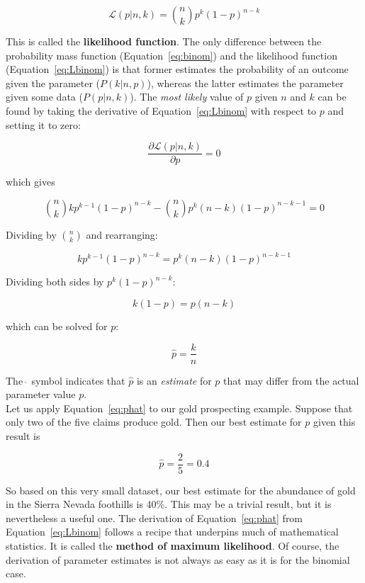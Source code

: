 \begin{equation}
  \mathcal{L}(p|n,k) = \binom{n}{k} p^k (1-p)^{n-k}
  \label{eq:Lbinom}
\end{equation}

This is called the \textbf{likelihood function}. The only difference
between the probability mass function (Equation~\ref{eq:binom}) and
the likelihood function (Equation~\ref{eq:Lbinom}) is that former
estimates the probability of an outcome given the parameter
($P(k|n,p)$), whereas the latter estimates the parameter given some
data ($P(p|n,k)$). The \emph{most likely} value of $p$ given $n$ and
$k$ can be found by taking the derivative of Equation~\ref{eq:Lbinom}
with respect to $p$ and setting it to zero:

\[
\frac{\partial{\mathcal{L}(p|n,k)}}{\partial{p}} = 0
\]

\noindent which gives

\[
  \binom{n}{k} k p^{k-1} (1-p)^{n-k} -  \binom{n}{k} p^k (n-k) (1-p)^{n-k-1} = 0
\]

Dividing by $\binom{n}{k}$ and rearranging:

\[
  k p^{k-1} (1-p)^{n-k} = p^k (n-k) (1-p)^{n-k-1}
\]

Dividing both sides by $p^k (1-p)^{n-k}$:

\[
k (1-p) = p (n-k)
\]

\noindent which can be solved for $p$:

\begin{equation}
  \hat{p} = \frac{k}{n}
  \label{eq:phat}
\end{equation}

The $\hat{~}$ symbol indicates that $\hat{p}$ is an \emph{estimate}
for $p$ that may differ from the actual parameter value $p$.\\

Let us apply Equation~\ref{eq:phat} to our gold prospecting example.
Suppose that only two of the five claims produce gold. Then our best
estimate for $p$ given this result is

\[
\hat{p} = \frac{2}{5} = 0.4
\]

So based on this very small dataset, our best estimate for the
abundance of gold in the Sierra Nevada foothills is 40\%. This may be
a trivial result, but it is nevertheless a useful one. The derivation
of Equation~\ref{eq:phat} from Equation~\ref{eq:Lbinom} follows a
recipe that underpins much of mathematical statistics. It is called
the \textbf{method of maximum likelihood}. Of course, the derivation
of parameter estimates is not always as easy as it is for the binomial
case.

